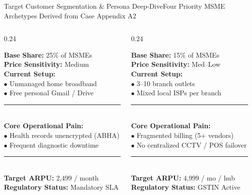 \documentclass[aspectratio=169,10pt]{beamer}
\newcommand{\inr}{\text{Rs.\ }}
\begin{document}
\begin{frame}{Target Customer Segmentation \& Persona Deep-Dive}{Four Priority MSME Archetypes Derived from Case Appendix A2}
\begin{columns}[T]
    \begin{column}{0.24\textwidth}
      \begin{tcolorbox}[academicbox, title={\fontsize{5.5pt}{6.6pt}\selectfont\textbf{2. Clinics \& Labs}}, coltitle=charcoal]
        {\fontsize{4.8pt}{5.8pt}\selectfont
        \textbf{Base Share:} 25\% of MSMEs \\
        \textbf{Price Sensitivity:} Medium \\
        \textbf{Current Setup:} \\
        $\bullet$ Unmanaged home broadband \\
        $\bullet$ Free personal Gmail / Drive \\
        \textcolor{bordergray}{\rule{\linewidth}{0.25pt}} \\
        \textbf{Core Operational Pain:} \\
        $\bullet$ Health records unencrypted (ABHA) \\
        $\bullet$ Frequent diagnostic downtime \\
        \textcolor{bordergray}{\rule{\linewidth}{0.25pt}} \\
        \textbf{Target ARPU:} \inr 2,499 / month \\
        \textbf{Regulatory Status:} Mandatory SLA
        }
      \end{tcolorbox}
    \end{column}

    \begin{column}{0.24\textwidth}
      \begin{tcolorbox}[academicbox, title={\fontsize{5.5pt}{6.6pt}\selectfont\textbf{3. Multi-Site Chains}}, coltitle=charcoal]
        {\fontsize{4.8pt}{5.8pt}\selectfont
        \textbf{Base Share:} 15\% of MSMEs \\
        \textbf{Price Sensitivity:} Med--Low \\
        \textbf{Current Setup:} \\
        $\bullet$ 3--10 branch outlets \\
        $\bullet$ Mixed local ISPs per branch \\
        \textcolor{bordergray}{\rule{\linewidth}{0.25pt}} \\
        \textbf{Core Operational Pain:} \\
        $\bullet$ Fragmented billing (5+ vendors) \\
        $\bullet$ No centralized CCTV / POS failover \\
        \textcolor{bordergray}{\rule{\linewidth}{0.25pt}} \\
        \textbf{Target ARPU:} \inr 4,999 / mo / hub \\
        \textbf{Regulatory Status:} GSTIN Active
        }
      \end{tcolorbox}
    \end{column}


\end{columns}
\end{frame}
\end{document}
